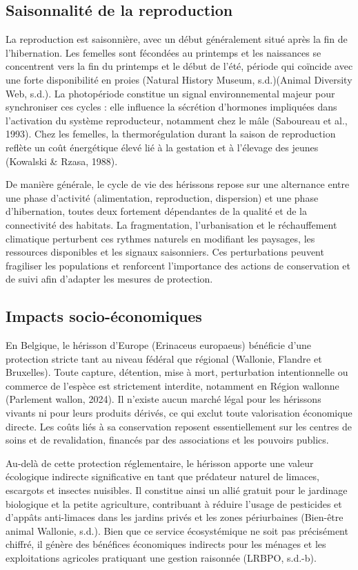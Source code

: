 \documentclass[a4paper,11pt]{article}
\begin{document}
\subsection{Saisonnalité de la reproduction}

La reproduction est saisonnière, avec un début généralement situé après la fin de l’hibernation. Les femelles sont fécondées au printemps et les naissances se concentrent vers la fin du printemps et le début de l’été, période qui coïncide avec une forte disponibilité en proies (Natural History Museum, s.d.)(Animal Diversity Web, s.d.). La photopériode constitue un signal environnemental majeur pour synchroniser ces cycles : elle influence la sécrétion d’hormones impliquées dans l’activation du système reproducteur, notamment chez le mâle (Saboureau et al., 1993). Chez les femelles, la thermorégulation durant la saison de reproduction reflète un coût énergétique élevé lié à la gestation et à l’élevage des jeunes (Kowalski \& Rzasa, 1988).

De manière générale, le cycle de vie des hérissons repose sur une alternance entre une phase d’activité (alimentation, reproduction, dispersion) et une phase d’hibernation, toutes deux fortement dépendantes de la qualité et de la connectivité des habitats. La fragmentation, l’urbanisation et le réchauffement climatique perturbent ces rythmes naturels en modifiant les paysages, les ressources disponibles et les signaux saisonniers. Ces perturbations peuvent fragiliser les populations et renforcent l’importance des actions de conservation et de suivi afin d’adapter les mesures de protection.

\subsection{Impacts socio-économiques}

En Belgique, le hérisson d’Europe (Erinaceus europaeus) bénéficie d’une protection stricte tant au niveau fédéral que régional (Wallonie, Flandre et Bruxelles). Toute capture, détention, mise à mort, perturbation intentionnelle ou commerce de l’espèce est strictement interdite, notamment en Région wallonne (Parlement wallon, 2024). Il n’existe aucun marché légal pour les hérissons vivants ni pour leurs produits dérivés, ce qui exclut toute valorisation économique directe. Les coûts liés à sa conservation reposent essentiellement sur les centres de soins et de revalidation, financés par des associations et les pouvoirs publics.

Au-delà de cette protection réglementaire, le hérisson apporte une valeur écologique indirecte significative en tant que prédateur naturel de limaces, escargots et insectes nuisibles. Il constitue ainsi un allié gratuit pour le jardinage biologique et la petite agriculture, contribuant à réduire l’usage de pesticides et d’appâts anti-limaces dans les jardins privés et les zones périurbaines (Bien-être animal Wallonie, s.d.). Bien que ce service écosystémique ne soit pas précisément chiffré, il génère des bénéfices économiques indirects pour les ménages et les exploitations agricoles pratiquant une gestion raisonnée (LRBPO, s.d.-b).
\end{document}

